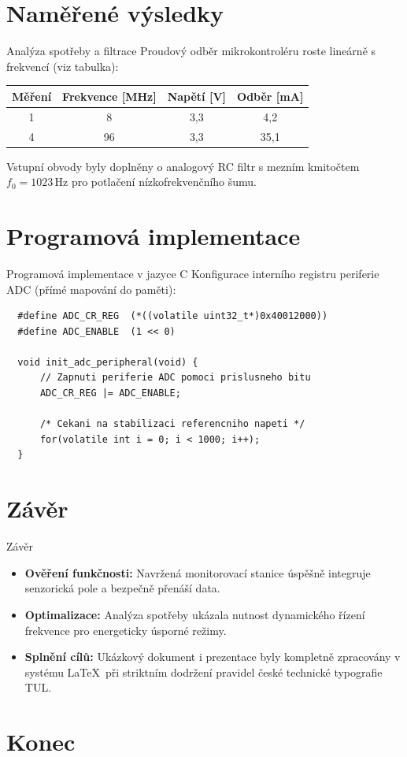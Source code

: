 \documentclass[FM,aspect169]{tulpresentation}
\begin{document}
\section{Naměřené výsledky}
\begin{frame}{Analýza spotřeby a filtrace}
  Proudový odběr mikrokontroléru roste lineárně s frekvencí (viz tabulka):
  \begin{center}
    \begin{tabular}{|c|c|c|c|}
        \hline
        \textbf{Měření} & \textbf{Frekvence [MHz]} & \textbf{Napětí [V]} & \textbf{Odběr [mA]} \\ \hline
        1 & 8  & 3,3 & 4,2  \\ \hline
        4 & 96 & 3,3 & 35,1 \\ \hline
    \end{tabular}
  \end{center}
  \vspace{0.1cm}
  Vstupní obvody byly doplněny o analogový RC filtr s mezním kmitočtem $f_0 = 1023\,\mathrm{Hz}$ pro potlačení nízkofrekvenčního šumu.
\end{frame}

\section{Programová implementace}
\begin{frame}[fragile]{Programová implementace v jazyce C}
  Konfigurace interního registru periferie ADC (přímé mapování do paměti):
  \begin{verbatim}
  #define ADC_CR_REG  (*((volatile uint32_t*)0x40012000))
  #define ADC_ENABLE  (1 << 0)

  void init_adc_peripheral(void) {
      // Zapnuti periferie ADC pomoci prislusneho bitu
      ADC_CR_REG |= ADC_ENABLE;
      
      /* Cekani na stabilizaci referencniho napeti */
      for(volatile int i = 0; i < 1000; i++);
  }
  \end{verbatim}
\end{frame}

\section{Závěr}
\begin{frame}{Závěr}
  \begin{itemize}
    \item \textbf{Ověření funkčnosti:} Navržená monitorovací stanice úspěšně integruje senzorická pole a bezpečně přenáší data.
    \item \textbf{Optimalizace:} Analýza spotřeby ukázala nutnost dynamického řízení frekvence pro energeticky úsporné režimy.
    \item \textbf{Splnění cílů:} Ukázkový dokument i prezentace byly kompletně zpracovány v systému \LaTeX\ při striktním dodržení pravidel české technické typografie TUL.
  \end{itemize}
\end{frame}

\section*{Konec}
\TULendframe 
\end{document}
